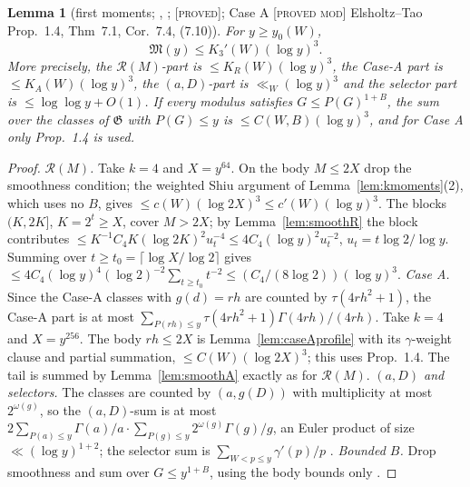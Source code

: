 \documentclass[10pt,reqno]{amsart}
\newtheorem{lemma}[theorem]{Lemma}
\theoremstyle{definition}
\theoremstyle{remark}
\newcommand{\cR}{\mathscr R}
\newcommand{\cG}{\mathfrak G}
\newcommand{\lab}[1]{\textup{[\textsc{#1}]}}
\begin{document}
\begin{lemma}[first moments; {\cite[Cors.~2.4, 3.2, 3.3]{KA3}}, {\cite[Lemmas~3.3, 3.3$'$]{KA2}}; \lab{proved}; Case A \lab{proved mod} Elsholtz--Tao Prop.~1.4, Thm~7.1, Cor.~7.4, (7.10)]\label{lem:firstnoB}
For $y\geq y_0(W)$,
\[
 \mathfrak M(y)\leq K_3'(W)(\log y)^3.
\]
More precisely, the $\cR(M)$-part is $\leq K_R(W)(\log y)^3$, the Case-A part
is $\leq K_A(W)(\log y)^3$, the $(a,D)$-part is $\ll_W(\log y)^3$ and the selector
part is $\leq\log\log y+O(1)$.  If every modulus satisfies $G\leq P(G)^{1+B}$, the
sum over the classes of $\cG$ with $P(G)\leq y$ is $\leq C(W,B)(\log y)^3$, and
for Case A only Prop.~1.4 is used.
\end{lemma}
\begin{proof}
\emph{$\cR(M)$.}  Take $k=4$ and $X=y^{64}$.  On the body $M\leq2X$ drop the
smoothness condition; the weighted Shiu argument of
Lemma~\ref{lem:kmoments}(2), which uses no $B$, gives $\leq c(W)(\log2X)^3\leq
c'(W)(\log y)^3$.  The blocks $(K,2K]$, $K=2^t\geq X$, cover $M>2X$; by
Lemma~\ref{lem:smoothR} the block contributes
$\leq K^{-1}C_4K(\log2K)^2u_t^{-4}\leq4C_4(\log y)^2u_t^{-2}$, $u_t=t\log2/\log y$.
Summing over $t\geq t_0=\lceil\log X/\log2\rceil$ gives
$\leq4C_4(\log y)^4(\log2)^{-2}\sum_{t\geq t_0}t^{-2}\leq(C_4/(8\log2))(\log y)^3$.
\emph{Case A.}  Since the Case-A classes with $g(d)=rh$ are counted by
$\tau(4rh^2+1)$, the Case-A part is at most
$\sum_{P(rh)\leq y}\tau(4rh^2+1)\Gamma(4rh)/(4rh)$.  Take $k=4$ and $X=y^{256}$.
The body $rh\leq2X$ is Lemma~\ref{lem:caseAprofile} with its $\gamma$-weight
clause and partial summation, $\leq C(W)(\log2X)^3$; this uses Prop.~1.4.
The tail is summed by Lemma~\ref{lem:smoothA} exactly as for $\cR(M)$.
\emph{$(a,D)$ and selectors.}  The classes are counted by $(a,g(D))$ with
multiplicity at most $2^{\omega(g)}$, so the $(a,D)$-sum is at most
$2\sum_{P(a)\leq y}\Gamma(a)/a\cdot\sum_{P(g)\leq y}2^{\omega(g)}\Gamma(g)/g$, an Euler
product of size $\ll(\log y)^{1+2}$; the selector sum is
$\sum_{W<p\leq y}\gamma'(p)/p$ \cite[Lemmas~3.3, 3.3$'$]{KA2}.
\emph{Bounded $B$.}  Drop smoothness and sum over $G\leq y^{1+B}$, using the
body bounds only \cite[\S3]{KA2}.
\end{proof}
\end{document}
